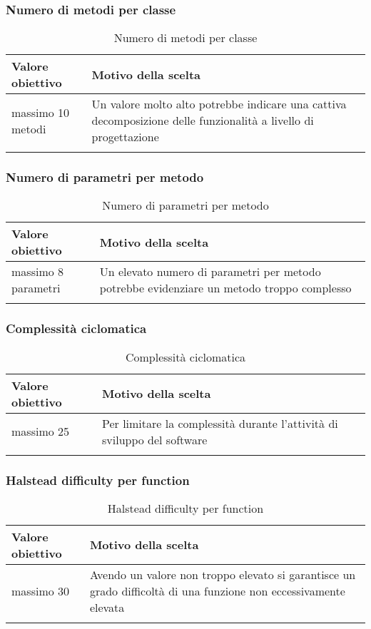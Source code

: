 \documentclass[../PianoDiQualifica_v4.0.0.tex]{subfiles}
\begin{document}
		\subsubsection{Numero di metodi per classe}
			\begin{longtable}[c] { >{\centering\arraybackslash}p{4cm} p{7cm} }
				\toprule
				\centerline{\textbf{Valore obiettivo}} & \centerline{\textbf{Motivo della scelta}} \\
				\midrule
					massimo 10 metodi & Un valore molto alto potrebbe indicare una cattiva decomposizione delle funzionalità a livello di progettazione \\
				\bottomrule
				\caption{Numero di metodi per classe}
			\end{longtable}

		\subsubsection{Numero di parametri per metodo}
			\begin{longtable}[c] { >{\centering\arraybackslash}p{4cm} p{7cm} }
				\toprule
				\centerline{\textbf{Valore obiettivo}} & \centerline{\textbf{Motivo della scelta}} \\
				\midrule
					massimo 8 parametri & Un elevato numero di parametri per metodo potrebbe evidenziare un metodo troppo complesso \\
				\bottomrule
				\caption{Numero di parametri per metodo}
			\end{longtable}

		\subsubsection{Complessità ciclomatica}
			\begin{longtable}[c] { >{\centering\arraybackslash}p{4cm} p{7cm} }
				\toprule
				\centerline{\textbf{Valore obiettivo}} & \centerline{\textbf{Motivo della scelta}} \\
				\midrule
					massimo 25 & Per limitare la complessità durante l'attività di sviluppo del software \\
				\bottomrule
				\caption{Complessità ciclomatica}
			\end{longtable}

		\subsubsection{Halstead difficulty per function}
			\begin{longtable}[c] { >{\centering\arraybackslash}p{4cm} p{7cm} }
				\toprule
				\centerline{\textbf{Valore obiettivo}} & \centerline{\textbf{Motivo della scelta}} \\
				\midrule
					massimo 30 & Avendo un valore non troppo elevato si garantisce un grado difficoltà di una funzione non eccessivamente elevata  \\
				\bottomrule
				\caption{Halstead difficulty per function}
			\end{longtable}
\end{document}
